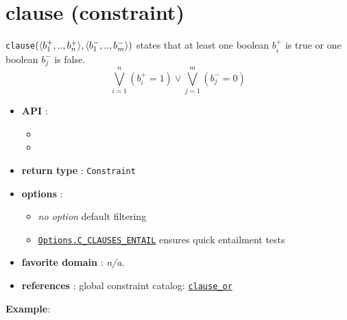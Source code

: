 \label{clause}
\hypertarget{clause}{}

\section{clause (constraint)}\label{clause:clauseconstraint}\hypertarget{clause:clauseconstraint}{}
\begin{notedef}
  \texttt{clause}$(\langle b^+_1,..,b^+_n\rangle, \langle b^-_1,..,b^-_m\rangle)$ states that at least one boolean $b^+_i$ is true or one boolean $b^-_j$ is false.
 $$\bigvee_{i=1}^n (b^+_i=1) \vee \bigvee_{j=1}^m (b^-_j=0)$$
\end{notedef}

\begin{itemize}
	\item \textbf{API} :
	\begin{itemize}
		\item {}
		\item {}
	\end{itemize}
	\item \textbf{return type} : \texttt{Constraint}
	\item \textbf{options} :
	\begin{itemize}
		\item \emph{no option} default filtering
		\item \hyperlink{cclause:cclauseoptions}{\tt Options.C\_CLAUSES\_ENTAIL} ensures quick entailment tests
	\end{itemize}
	\item \textbf{favorite domain} : \emph{n/a}.
	\item \textbf{references} : global constraint catalog: \href{http://www.emn.fr/x-info/sdemasse/gccat/Cclause_or.html}{\tt clause\_or}
\end{itemize}



\textbf{Example}:


